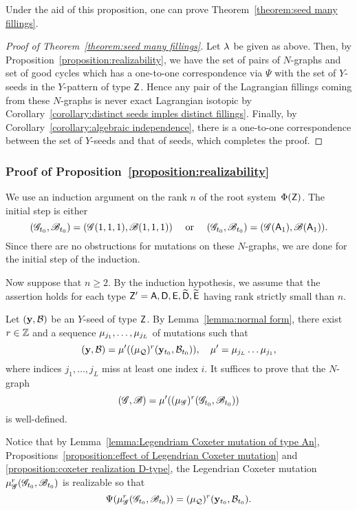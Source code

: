 Under the aid of this proposition, one can prove Theorem~\ref{theorem:seed many fillings}.
\begin{proof}[Proof of Theorem~\ref{theorem:seed many fillings}]
Let $\lambda$ be given as above.
Then, by Proposition~\ref{proposition:realizability}, we have the set of pairs of $N$-graphs and set of good cycles which has a one-to-one correspondence via $\Psi$ with the set of $Y$-seeds in the $Y$-pattern of type $\mathsf{Z}$.
Hence any pair of the Lagrangian fillings coming from these $N$-graphs is never exact Lagrangian isotopic by Corollary~\ref{corollary:distinct seeds imples distinct fillings}.
Finally, by Corollary~\ref{corollary:algebraic independence}, there is a one-to-one correspondence between the set of $Y$-seeds and that of seeds, which completes the proof.
\end{proof}



\subsubsection{Proof of Proposition~\ref{proposition:realizability}}

We use an induction argument on the rank $n$ of the root system~$\Phi(\mathsf{Z})$.
The initial step is either
\[
(\mathscr{G}_{t_0},\mathscr{B}_{t_0})=(\mathscr{G}(1,1,1),\mathscr{B}(1,1,1))\quad\text{ or }\quad (\mathscr{G}_{t_0},\mathscr{B}_{t_0})=(\mathscr{G}(\mathsf{A}_1),\mathscr{B}(\mathsf{A}_1)).
\]
Since there are no obstructions for mutations on these $N$-graphs, we are done for the initial step of the induction.

Now suppose that $n\ge2$.
By the induction hypothesis, we assume that the assertion holds for each type $\mathsf{Z}' =\mathsf{A}, \mathsf{D}, \mathsf{E}, \widetilde{\mathsf{D}}, \widetilde{\mathsf{E}}$ having rank strictly small than $n$.

Let $(\mathbf{y}, \mathcal{B})$ be an $Y$-seed of type $\mathsf{Z}$. By Lemma~\ref{lemma:normal form}, there exist $r\in\mathbb{Z}$ and a sequence $\mu_{j_1},\dots,\mu_{j_L}$ of mutations such that
\[
(\mathbf{y}, \mathcal{B})=
\mu'((\mu_\mathcal{Q})^r(\mathbf{y}_{t_0},\mathcal{B}_{t_0})),\quad
\mu'=\mu_{j_L}\dots\mu_{j_1},
\]
where indices $j_1,\dots,j_L$ miss at least one index $i$.
It suffices to prove that the $N$-graph
\[
(\mathscr{G}, \mathscr{B})
=\mu'((\mu_\mathscr{G})^r(\mathscr{G}_{t_0},\mathscr{B}_{t_0}))
\]
is well-defined.

Notice that by Lemma~\ref{lemma:Legendriam Coxeter mutation of type An}, Propositions~\ref{proposition:effect of Legendrian Coxeter mutation} and \ref{proposition:coxeter realization D-type}, the Legendrian Coxeter mutation $\mu_\mathscr{G}^r(\mathscr{G}_{t_0}, \mathscr{B}_{t_0})$ is realizable so that
\[
\Psi(\mu_\mathscr{G}^r(\mathscr{G}_{t_0}, \mathscr{B}_{t_0}))
=(\mu_\mathcal{Q})^r(\mathbf{y}_{t_0},\mathcal{B}_{t_0}).
\]


